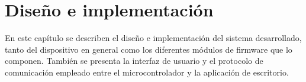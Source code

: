 \chapter{Diseño e implementación} %

\label{Chapter3} %

En este capítulo se describen el diseño e implementación del sistema desarrollado, tanto del dispositivo en general como los diferentes módulos de firmware que lo componen. También se presenta la interfaz de usuario y el protocolo de comunicación empleado entre el microcontrolador y la aplicación de escritorio.


